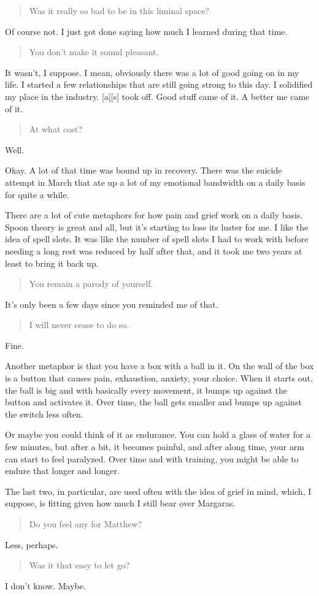 \begin{quote}
Was it really so bad to be in this liminal space?
\end{quote}

Of course not. I just got done saying how much I learned during that time.

\begin{quote}
You don't make it sound pleasant.
\end{quote}

It wasn't, I suppose. I mean, obviously there was a lot of good going on in my life. I started a few relationships that are still going strong to this day. I solidified my place in the industry. {[}a{]}{[}s{]} took off. Good stuff came of it. A better me came of it.

\begin{quote}
At what cost?
\end{quote}

Well.

Okay. A lot of that time was bound up in recovery. There was the suicide attempt in March that ate up a lot of my emotional bandwidth on a daily basis for quite a while.

There are a lot of cute metaphors for how pain and grief work on a daily basis. Spoon theory is great and all, but it's starting to lose its luster for me. I like the idea of spell slots. It was like the number of spell slots I had to work with before needing a long rest was reduced by half after that, and it took me two years at least to bring it back up.

\begin{quote}
You remain a parody of yourself.
\end{quote}

It's only been a few days since you reminded me of that.

\begin{quote}
I will never cease to do so.
\end{quote}

Fine.

Another metaphor is that you have a box with a ball in it. On the wall of the box is a button that causes pain, exhaustion, anxiety, your choice. When it starts out, the ball is big and with basically every movement, it bumps up against the button and activates it. Over time, the ball gets smaller and bumps up against the switch less often.

Or maybe you could think of it as endurance. You can hold a glass of water for a few minutes, but after a bit, it becomes painful, and after along time, your arm can start to feel paralyzed. Over time and with training, you might be able to endure that longer and longer.

The last two, in particular, are used often with the idea of grief in mind, which, I suppose, is fitting given how much I still bear over Margaras.

\begin{quote}
Do you feel any for Matthew?
\end{quote}

Less, perhaps.

\begin{quote}
Was it that easy to let go?
\end{quote}

I don't know. Maybe.

